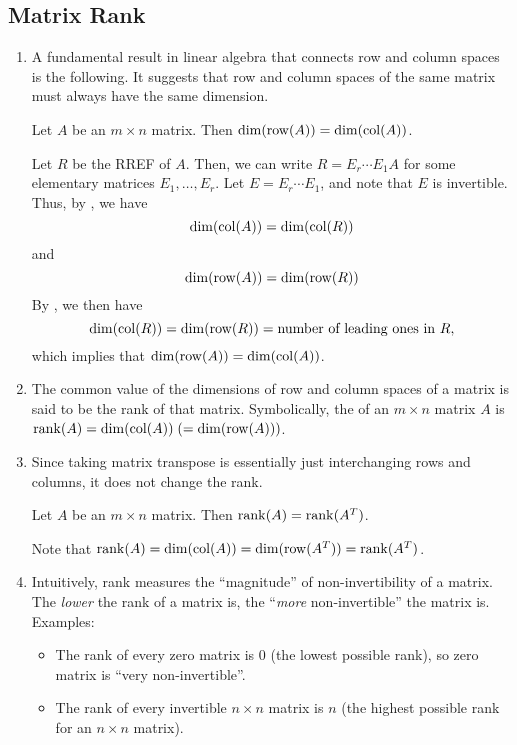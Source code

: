 \subsection{Matrix Rank}
\begin{enumerate}
\item A fundamental result in linear algebra that connects row and column
spaces is the following. It suggests that row and column spaces of the same
matrix must always have the same dimension.
\begin{theorem}
\label{thm:row-col-same-dim}
Let \(A\) be an \(m\times n\) matrix. Then \(\dim(\operatorname{row}(A))=\dim(\operatorname{col}(A))\).
\end{theorem}
\begin{pf}
Let \(R\) be the RREF of \(A\). Then, we can write \(R=E_r\dotsb E_1A\) for
some elementary matrices \(E_1,\dotsc,E_r\). Let \(E=E_r\dotsb E_1\), and note
that \(E\) is invertible. Thus, by
, we
have
\[
\dim(\operatorname{col}(A))=\dim(\operatorname{col}(R))
\]
and
\[
\dim(\operatorname{row}(A))=\dim(\operatorname{row}(R))
\]
By , we
then have
\[
\dim(\operatorname{col}(R))=\dim(\operatorname{row}(R))=\text{number of leading ones in \(R\)},
\]
which implies that \(\dim(\operatorname{row}(A))=\dim(\operatorname{col}(A))\).
\end{pf}

\item The common value of the dimensions of row and column spaces of a matrix
is said to be the rank of that matrix. Symbolically, the  of an
\(m\times n\) matrix \(A\) is \(\operatorname{rank}(A)=\dim(\operatorname{col}(A))\;(=\dim(\operatorname{row}(A)))\).

\item Since taking matrix transpose is essentially just interchanging rows and
columns, it does not change the rank.

\begin{corollary}
\label{cor:matx-trans-same-rk}
Let \(A\) be an \(m\times n\) matrix. Then \(\operatorname{rank}(A)=\operatorname{rank}(A^{T})\).
\end{corollary}
\begin{pf}
Note that \(\operatorname{rank}(A)=\dim(\operatorname{col}(A))=\dim(\operatorname{row}(A^{T}))=\operatorname{rank}(A^{T})\).
\end{pf}

\item Intuitively, rank measures the ``magnitude'' of non-invertibility of a
matrix. The \emph{lower} the rank of a matrix is, the ``\emph{more}
non-invertible'' the matrix is. Examples:
\begin{itemize}
\item The rank of every zero matrix is \(0\) (the lowest possible rank), so
zero matrix is ``very non-invertible''.
\item The rank of every invertible \(n\times n\) matrix is \(n\) (the highest
possible rank for an \(n\times n\) matrix).


\end{itemize}
\end{enumerate}
